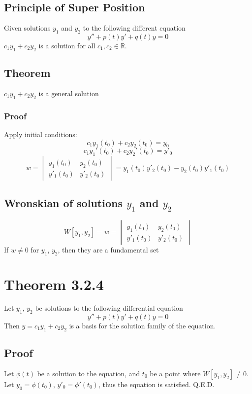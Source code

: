 \documentclass[12pt]{article}
\begin{document}
\subsection*{Principle of Super Position}
Given solutions $y_1$ and $y_2$ to the following different equation
\[y''+p(t)y'+q(t)y=0\]
$c_1y_1+c_2y_2$ is a solution for all $c_1,c_2\in\mathbb{R}$.
\subsection*{Theorem}
$c_1y_1+c_2y_2$ is a general solution
\subsubsection*{Proof}
Apply initial conditions:
\[c_1y_1(t_0)+c_2y_2(t_0)=y_0\]
\[c_1y_1'(t_0)+c_2y_2'(t_0)=y'_0\]
\[w=\begin{vmatrix}
        y_1(t_0) & y_2(t_0) \\y'_1(t_0) & y'_2(t_0)
    \end{vmatrix}=y_1(t_0)y'_2(t_0)-y_2(t_0)y'_1(t_0)\]
\subsection*{Wronskian of solutions $y_1$ and $y_2$}
\[W[y_1,y_2]=w=\begin{vmatrix}
        y_1(t_0) & y_2(t_0) \\ y'_1(t_0) & y'_2(t_0)
    \end{vmatrix}\]
If $w\neq0$ for $y_1$, $y_2$, then they are a fundamental set
\section*{Theorem 3.2.4}
Let $y_1$, $y_2$ be solutions to the following differential equation
\[y''+p(t)y'+q(t)y=0\]
Then $y=c_1y_1+c_2y_2$ is a basis for the solution family of the equation.
\subsection*{Proof}
Let $\phi(t)$ be a solution to the equation, and $t_0$ be a point where $W[y_1,y_2]\neq0$. Let $y_0=\phi(t_0)$, $y'_0=\phi'(t_0)$, thus the equation is satisfied. Q.E.D.
\end{document}
